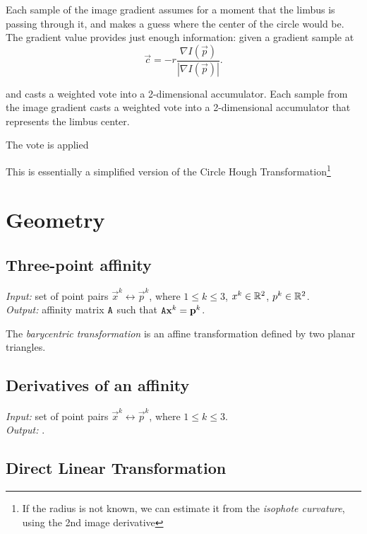 Each sample of the image gradient assumes for a moment that the limbus is passing through it, and makes a guess where the center of the circle would be.
The gradient value provides just enough information: given a gradient sample at 
$$\vec c = -r \frac {\nabla I(\vec p)} {|\nabla I(\vec p)|}.$$

and casts a weighted vote into a 2-dimensional accumulator.
Each sample from the image gradient casts a weighted vote into a 2-dimensional accumulator that represents the limbus center.

The vote is applied 

This is essentially a simplified version of the Circle Hough Transformation\footnote{
If the radius is not known, we can estimate it from the \textit{isophote curvature}, using the 2nd image derivative
\todo{\dots}
}
\todo{\dots}

\section{Geometry}

\subsection{Three-point affinity}

\textit{Input:} set of point pairs $\vec x^k \leftrightarrow \vec p^k$, where $1 \leq k \leq 3$, $x^k \in \mathbb{R}^2$, $p^k \in \mathbb{R}^2$.\\
\textit{Output:} affinity matrix $\mathtt{A}$ such that $\mathtt{A} \mathbf{x}^k = \mathbf{p}^k$.\\


The \textit{barycentric transformation} is an affine transformation defined by two planar triangles.

\subsection{Derivatives of an affinity}

\textit{Input:} set of point pairs $\vec x^k \leftrightarrow \vec p^k$, where $1 \leq k \leq 3$.\\
\textit{Output:} .\\


\subsection{Direct Linear Transformation}

